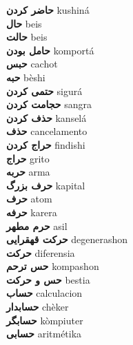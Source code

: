 \textbf{ حاضر کردن  } kushiná \\
\textbf{ حال  } beis \\
\textbf{ حالت  } beis \\
\textbf{ حامل بودن  } komportá \\
\textbf{ حبس  } cachot \\
\textbf{ حبه  } bèshi \\
\textbf{ حتمی کردن  } sigurá \\
\textbf{ حجامت کردن  } sangra \\
\textbf{ حذف کردن  } kanselá \\
\textbf{ حذف  } cancelamento \\
\textbf{ حراج کردن  } findishi \\
\textbf{ حراج  } grito \\
\textbf{ حربه  } arma \\
\textbf{ حرف بزرگ  } kapital \\
\textbf{ حرف  } atom \\
\textbf{ حرفه  } karera \\
\textbf{ حرم مطهر  } asil \\
\textbf{ حرکت قهقرایی  } degenerashon \\
\textbf{ حرکت  } diferensia \\
\textbf{ حس ترحم  } kompashon \\
\textbf{ حس و حرکت  } bestia \\
\textbf{ حساب  } calculacion \\
\textbf{ حسابدار  } chèker \\
\textbf{ حسابگر  } kòmpiuter \\
\textbf{ حسابی  } aritmétika \\
